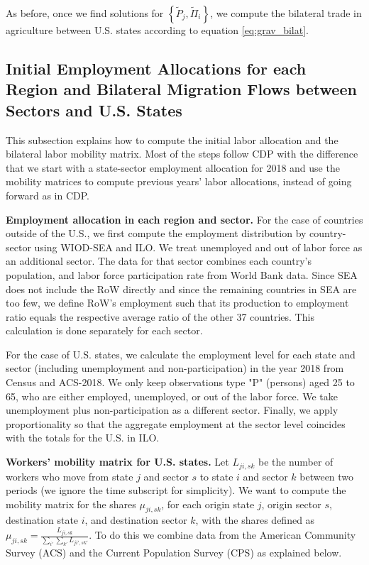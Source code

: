 \documentclass[12pt]{article}
\begin{document}
As before, once we find solutions for  $\left\{ \tilde{P}_{j}, \tilde{\Pi}_{i} \right\}$, we compute the  bilateral trade in agriculture between U.S. states according to equation \eqref{eq:grav_bilat}.

\subsection{Initial Employment Allocations for each Region and Bilateral Migration Flows between Sectors and U.S. States}\label{sec:appendix_data_migration}

This subsection explains how to compute the initial labor allocation and the bilateral labor mobility matrix. Most of the steps follow CDP with the difference that we start with a state-sector employment allocation for 2018 and use the mobility matrices to compute previous years' labor allocations, instead of going forward as in CDP. 

\textbf{Employment allocation in each region and sector.} For the case of countries outside of the U.S., we first compute the employment distribution by country-sector using WIOD-SEA and ILO. We treat unemployed and out of labor force as an additional sector. The data for that sector combines each country's population, and labor force participation rate from World Bank data. Since SEA does not include the RoW directly and since the remaining countries in SEA are too few, we define RoW's employment such that its production to employment ratio equals the respective average ratio of the other 37 countries. This calculation is done separately for each sector. 

For the case of U.S. states, we calculate the employment level for each state and sector (including unemployment and non-participation) in the year 2018 from Census and ACS-2018. We only keep observations type "P" (persons) aged 25 to 65, who are either employed, unemployed, or out of the labor force. We take unemployment plus non-participation as a different sector. Finally, we apply proportionality so that the aggregate employment at the sector level coincides with the totals for the U.S. in ILO. 

\textbf{Workers' mobility matrix for U.S. states.} Let \(L_{ji,sk}\) be the number of workers who move from state $j$
and sector $s$ to state $i$ and sector $k$ between two periods (we ignore the time subscript for simplicity). We want to compute the mobility matrix for the shares  \(\mu_{ji,sk}\), for each origin state \(j\), origin sector \(s\), destination state \(i\), and destination sector \(k\), with the shares defined as  \(\mu_{ji,sk}=\frac{L_{ji,sk}}{\sum_{i'}\sum_{k'}L_{ji',sk'}}\).
To do this we combine data from the American Community Survey (ACS) and the Current Population Survey (CPS) as explained below. 
\end{document}
